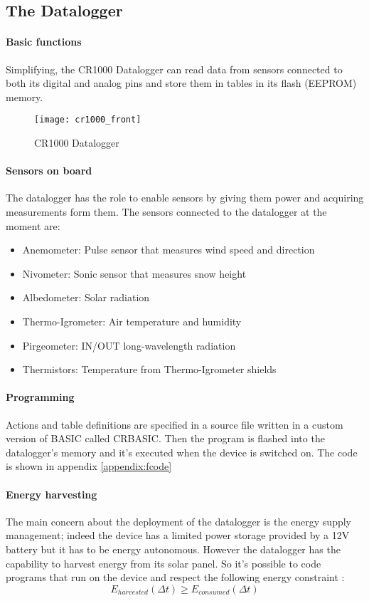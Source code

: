 \subsection{The Datalogger}
\paragraph{Basic functions \cite{cmp1}}
Simplifying, the CR1000 Datalogger can read data from sensors connected to both its digital and analog pins and store them in tables in its flash (EEPROM) memory.
\begin{figure}
	\centering
	\texttt{[image: cr1000\_front]}
	\caption{CR1000 Datalogger}
	\label{fig:cr1000}
\end{figure}
\paragraph{Sensors on board \cite{avv1}}
The datalogger has the role to enable sensors by giving them power and acquiring measurements form them. The sensors connected to the datalogger at the moment are:
\begin{itemize}
    \item Anemometer: Pulse sensor that measures wind speed and direction
    \item Nivometer: Sonic sensor that measures snow height
    \item Albedometer: Solar radiation
    \item Thermo-Igrometer: Air temperature and humidity
    \item Pirgeometer: IN/OUT long-wavelength radiation
    \item Thermistors: Temperature from Thermo-Igrometer shields
\end{itemize}
\paragraph{Programming}
Actions and table definitions are specified in a source file written in a custom version of BASIC called CRBASIC. Then the program is flashed into the datalogger's memory and it's executed when the device is switched on. The code is shown in appendix \ref{appendix:fcode}
\paragraph{Energy harvesting}
The main concern about the deployment of the datalogger is the energy supply management; indeed the device has a limited power storage provided by a 12V battery but it has to be energy autonomous. However the datalogger has the capability to harvest energy from its solar panel. So it's possible to code programs that run on the device and respect the following energy constraint \cite{avv1}:
\begin{equation}
    E_{harvested}(\Delta t) \geq E_{consumed}(\Delta t)
\end{equation}